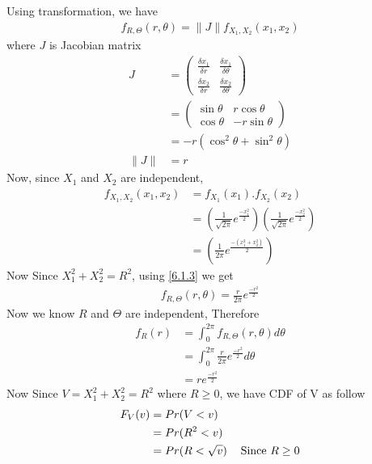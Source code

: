 \documentclass[journal,12pt,twocolumn]{IEEEtran}
\renewcommand\thesection{\arabic{section}}
\begin{document}
\begin{enumerate}[label=\thesection.\arabic*.,ref=\thesection.\theenumi]
Using transformation, we have
\begin{align}
    f_{R,\Theta}(r,\theta) = \|J\| f_{X_1,X_2}(x_1,x_2) \label{6.1.3}
\end{align}
where $J$ is Jacobian matrix
\begin{align}
    J &= \begin{pmatrix}
        \frac{\delta x_1}{\delta r} & \frac{\delta x_1}{\delta \theta} \\
        \frac{\delta x_2}{\delta r} & \frac{\delta x_2}{\delta \theta}
    \end{pmatrix} \\
    &=\begin{pmatrix}
        \sin \theta & r \cos \theta \\
        \cos \theta & -r \sin \theta 
    \end{pmatrix}\\
    &= -r(\cos^2 \theta + \sin^2 \theta) \\
    \|J\|&= r
\end{align}
Now, since $X_1$ and $X_2$ are independent,
\begin{align}
    f_{X_1,X_2}(x_1,x_2) &= f_{X_1}(x_1).f_{X_2}(x_2) \\
    &= \left(\frac{1}{\sqrt{2\pi}}e^{\frac{-x_1^2}{2}}\right) \left(\frac{1}{\sqrt{2\pi}}e^{\frac{-x_2^2}{2}}\right) \\
    &= \left(\frac{1}{2\pi}e^{\frac{-(x_1^2+x_2^2)}{2}}\right)
\end{align} 
Now Since $X_1^2+X_2^2 = R^2$, using \eqref{6.1.3} we get\\
\begin{align}
    f_{R,\Theta}(r,\theta) = \frac{r}{2\pi} e^{\frac{-r^2}{2}} 
\end{align}
Now we know $R$ and $\Theta$ are independent, Therefore
\begin{align}
    f_R(r) &= \int_{0}^{2\pi} f_{R,\Theta}(r,\theta) d\theta \\
    &= \int_{0}^{2\pi} \frac{r}{2\pi} e^{\frac{-r^2}{2}} d\theta \\
    &= r e^{\frac{-r^2}{2}} \label{6.1.14}
\end{align}
Now Since $V=X_1^2+X_2^2 = R^2$ where $R \geq 0$, we have CDF of V as follow
\begin{align}
    F_V(v) &= Pr(V < v) \\
    &= Pr(R^2 < v) \\
    &=Pr(R < \sqrt{v}) \hspace*{12pt} \text{Since } R\geq 0\\

\end{align}
\end{enumerate}
\end{document}
